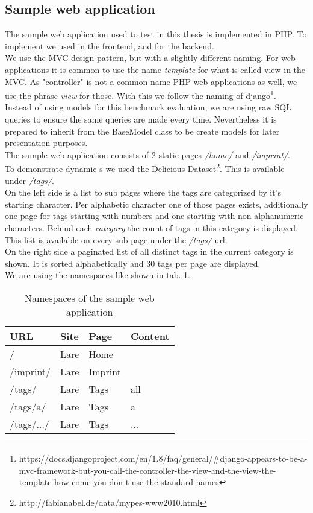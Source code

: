\subsection{Sample web application}

The sample web application used to test \lare{} in this thesis is implemented in PHP.
To implement \lare{} we used \lareJS{} in the frontend, \twigLare{} and \phpLare{} for the backend.
\\
We use the MVC design pattern, but with a slightly different naming.
For web applications it is common to use the name \emph{template} for what is called view in the MVC.
As "controller" is not a common name PHP web applications as well, we use the phrase \emph{view} for those.
With this we follow the naming of django\footnote{https://docs.djangoproject.com/en/1.8/faq/general/\#django-appears-to-be-a-mvc-framework-but-you-call-the-controller-the-view-and-the-view-the-template-how-come-you-don-t-use-the-standard-names}.
\\
Instead of using models for this benchmark evaluation, we are using raw SQL queries to ensure the same queries are made every time.
Nevertheless it is prepared to inherit from the BaseModel class to be create models for later presentation purposes.
\\
The sample web application consists of 2 static pages \emph{/home/} and \emph{/imprint/}.
\\
To demonstrate dynamic \WebPage{}s we used the Delicious Dataset\footnote{http://fabianabel.de/data/mypes-www2010.html}.
This is available under \emph{/tags/}.
\\
On the left side is a list to sub pages where the tags are categorized by it's starting character.
Per alphabetic character one of those pages exists, additionally one page for tags starting with numbers and one starting with non alphanumeric characters.
Behind each \emph{category} the count of tags in this category is displayed.
This list is available on every sub page under the \emph{/tags/} url.
\\
On the right side a paginated list of all distinct tags in the current category is shown.
It is sorted alphabetically and 30 tags per page are displayed.
\\
We are using the namespaces like shown in tab. \ref{tab:sampleapp_namespaces}.

\begin{table}[h]
\centering
\begin{tabular}{llll}
	\hline
	\textbf{URL} & \textbf{Site} & \textbf{Page} & \textbf{Content} \\
	\hline
	/ & Lare & Home &  \\
	/imprint/ & Lare & Imprint &  \\
	/tags/ & Lare & Tags & all \\
	/tags/a/ & Lare & Tags & a \\
	/tags/.../ & Lare & Tags & ... \\
	\hline
\end{tabular}
\caption{Namespaces of the sample web application}
\label{tab:sampleapp_namespaces}
\end{table}


